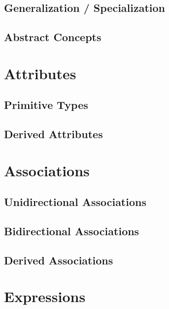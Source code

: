\documentclass[a4paper,oneside,12pt, extrafontsizes]{memoir}
\theoremstyle{definition}
\theoremstyle{definition}
\theoremstyle{definition}
\theoremstyle{definition}
\theoremstyle{definition}
\begin{document}
\section{Generalization / Specialization}
\label{sec:generalization}


\section{Abstract Concepts}
\label{sec:abstract}


\chapter{Attributes}
\label{ch:attributes}


\section{Primitive Types}
\label{sec:primitive-types}


\section{Derived Attributes}
\label{sec:derived-attributes}


\chapter{Associations}
\label{ch:associations}


\section{Unidirectional Associations}
\label{sec:assoc-unidir}

\section{Bidirectional Associations}
\label{sec:assoc-bidir}

\section{Derived Associations}
\label{sec:derived-associations}

\chapter{Expressions}
\label{ch:expressions}

\end{document}
